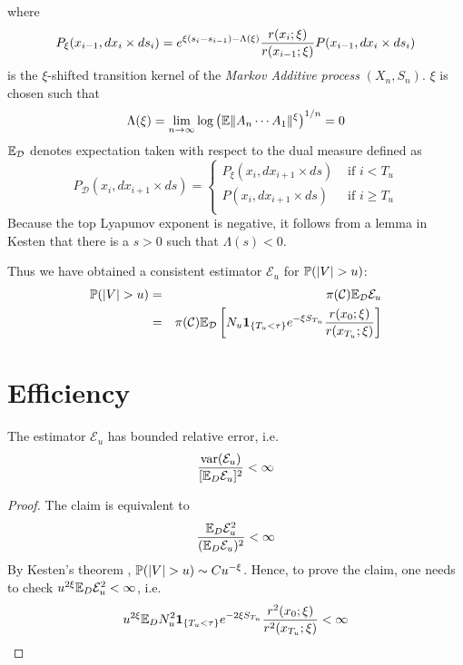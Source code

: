 \documentclass{article}
\begin{document}
where
\[
P_\xi(x_{i-1}, dx_i \times ds_i) = e^{\xi(s_i - s_{i-1}) -
  \Lambda(\xi)} {r(x_i; \xi) \over r(x_{i-1}; \xi)} P(x_{i-1}, dx_i
\times ds_i)
\]
is the $\xi$-shifted transition kernel of the {\it Markov Additive
  process} $(X_n, S_n)$. $\xi$ is chosen such that 
\[
\Lambda(\xi) = \lim_{n \to \infty} \log \left(
\E \|A_n \cdots A_1\|^\xi
\right)^{1/n} = 0
\]
$\E_{\mathcal D}$ denotes expectation taken with respect to the dual
measure defined as
\[
P_{\mathcal D} (x_i, dx_{i+1} \times ds) = \left\{
  \begin{array}{ll}
    P_\xi (x_i, dx_{i+1} \times ds) & \text{ if } i < T_u \\
    P(x_i, dx_{i+1} \times ds) & \text{ if } i \geq T_u \\
  \end{array}
\right.
\]
Because the top Lyapunov exponent is negative, it follows from a lemma
in Kesten \cite{Kesten1973} that there is a $s > 0$ such that
$\Lambda(s) < 0$.

Thus we have obtained a consistent estimator
$\mathcal E_u$ for $\P(|V| > u)$:
\begin{eqnarray*}
\P(|V| > u) &=& \pi(\mathcal C) \E_{\mathcal D} \mathcal E_u \\
&=& \pi(\mathcal C) \E_{\mathcal D} \left[
  N_u \1{T_u < \tau} e^{-\xi S_{T_u}} {r(x_0; \xi)
    \over r(x_{T_u}; \xi)}
\right]
\end{eqnarray*}

\section{Efficiency}\label{sec:efficiency}
\begin{theorem}
  The estimator $\mathcal E_u$ has bounded relative error, i.e.
  \begin{equation*}
    {\var(\mathcal E_u) \over [\E_D \mathcal E_u]^2} < \infty
  \end{equation*}
\end{theorem}
\begin{proof}
  The claim is equivalent to
  \[
  {\E_D \mathcal E_u^2 \over (\E_D \mathcal E_u)^2} < \infty
  \]
  By Kesten's theorem \cite{Kesten1973}, $\P(|V| > u) \sim C
  u^{-\xi}$. Hence, to prove the claim, one needs to check
  $u^{2\xi}\E_D \mathcal E_u^2 < \infty$, i.e.
  \[
  u^{2\xi} \E_D N_u^2 \1{T_u < \tau} e^{-2\xi S_{T_u}} {r^2(x_0; \xi)
    \over r^2(x_{T_u}; \xi)} < \infty
  \]
\end{proof}
\end{document}
